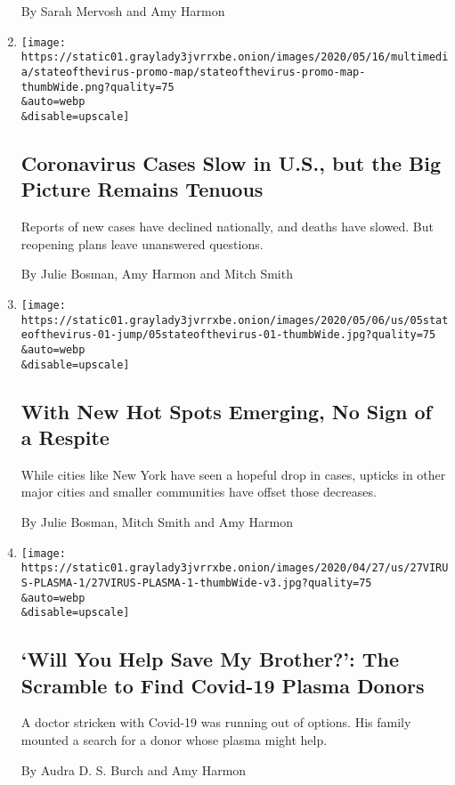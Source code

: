\begin{enumerate}
  By Sarah Mervosh and Amy Harmon
\item
  \href{/2020/05/16/us/coronavirus-united-states.html}{}

  \texttt{[image: https://static01.graylady3jvrrxbe.onion/images/2020/05/16/multimedia/stateofthevirus-promo-map/stateofthevirus-promo-map-thumbWide.png?quality=75\\\&auto=webp\\\&disable=upscale]}

  \hypertarget{coronavirus-cases-slow-in-us-but-the-big-picture-remains-tenuous}{%
  \subsection{Coronavirus Cases Slow in U.S., but the Big Picture
  Remains
  Tenuous}\label{coronavirus-cases-slow-in-us-but-the-big-picture-remains-tenuous}}

  Reports of new cases have declined nationally, and deaths have slowed.
  But reopening plans leave unanswered questions.

  By Julie Bosman, Amy Harmon and Mitch Smith
\item
  \href{/2020/05/05/us/coronavirus-deaths-cases-united-states.html}{}

  \texttt{[image: https://static01.graylady3jvrrxbe.onion/images/2020/05/06/us/05stateofthevirus-01-jump/05stateofthevirus-01-thumbWide.jpg?quality=75\\\&auto=webp\\\&disable=upscale]}

  \hypertarget{with-new-hot-spots-emerging-no-sign-of-a-respite}{%
  \subsection{With New Hot Spots Emerging, No Sign of a
  Respite}\label{with-new-hot-spots-emerging-no-sign-of-a-respite}}

  While cities like New York have seen a hopeful drop in cases, upticks
  in other major cities and smaller communities have offset those
  decreases.

  By Julie Bosman, Mitch Smith and Amy Harmon
\item
  \href{/2020/04/29/us/coronavirus-plasma-donors.html}{}

  \texttt{[image: https://static01.graylady3jvrrxbe.onion/images/2020/04/27/us/27VIRUS-PLASMA-1/27VIRUS-PLASMA-1-thumbWide-v3.jpg?quality=75\\\&auto=webp\\\&disable=upscale]}

  \hypertarget{will-you-help-save-my-brother-the-scramble-to-find-covid-19-plasma-donors}{%
  \subsection{`Will You Help Save My Brother?': The Scramble to Find
  Covid-19 Plasma
  Donors}\label{will-you-help-save-my-brother-the-scramble-to-find-covid-19-plasma-donors}}

  A doctor stricken with Covid-19 was running out of options. His family
  mounted a search for a donor whose plasma might help.

  By Audra D. S. Burch and Amy Harmon
\end{enumerate}

